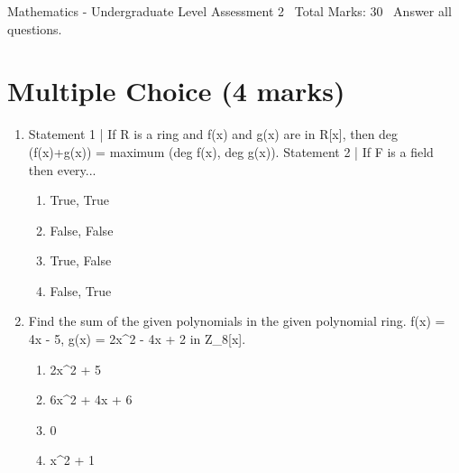 \documentclass[12pt]{article}
\begin{document}
\begin{center}
Mathematics - Undergraduate Level Assessment 2 \
Total Marks: 30 \
Answer all questions.
\end{center}

\section*{Multiple Choice (4 marks)}
\begin{enumerate}[label=\arabic*.]
\item Statement 1 | If R is a ring and f(x) and g(x) are in R[x], then deg (f(x)+g(x)) = maximum (deg f(x), deg g(x)). Statement 2 | If F is a field then every...
\begin{enumerate}[label=(\alph*)]
    \item True, True
    \item False, False
    \item True, False
    \item False, True
\end{enumerate}
\item Find the sum of the given polynomials in the given polynomial ring. f(x) = 4x - 5, g(x) = 2x\^{}2 - 4x + 2 in Z\_8[x].
\begin{enumerate}[label=(\alph*)]
    \item 2x\^{}2 + 5
    \item 6x\^{}2 + 4x + 6
    \item 0
    \item x\^{}2 + 1
\end{enumerate}
\end{enumerate}
\end{document}
